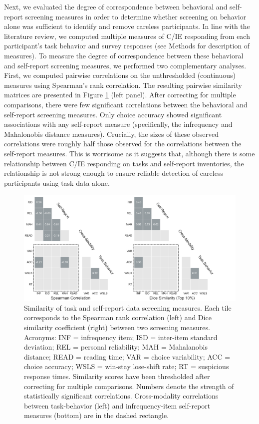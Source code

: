 \documentclass[a4paper,notitlepage,12pt]{article}
\begin{document}
Next, we evaluated the degree of correspondence between behavioral and self-report screening measures in order to determine whether screening on behavior alone was sufficient to identify and remove careless participants. In line with the literature review, we computed multiple measures of C/IE responding from each participant's task behavior and survey responses (see Methods for description of measures). To measure the degree of correspondence between these behavioral and self-report screening measures, we performed two complementary analyses. First, we computed pairwise correlations on the unthresholded (continuous) measures using Spearman's rank correlation. The resulting pairwise similarity matrices are presented in Figure \ref{fig:correspondence} (left panel). After correcting for multiple comparisons, there were few significant correlations between the behavioral and self-report screening measures. Only choice accuracy showed significant associations with any self-report measure (specifically, the infrequency and Mahalonobis distance measures). Crucially, the sizes of these observed correlations were roughly half those observed for the correlations between the self-report measures. This is worrisome as it suggests that, although there is some relationship between C/IE responding on tasks and self-report inventories, the relationship is not strong enough to ensure reliable detection of careless participants using task data alone.

\begin{figure}[!t]
\includegraphics[width=16cm, trim=0 0 3cm 0]{../figures/main_02b.png}
\centering
\captionsetup{width=0.88\textwidth}
\caption{Similarity of task and self-report data screening measures. Each tile corresponds to the Spearman rank correlation (left) and Dice similarity coefficient (right) between two screening measures. Acronyms: INF = infrequency item; ISD = inter-item standard deviation; REL = personal reliability; MAH = Mahalanobis distance; READ = reading time; VAR = choice variability; ACC = choice accuracy; WSLS = win-stay lose-shift rate; RT = suspicious response times. Similarity scores have been thresholded after correcting for multiple comparisons. Numbers denote the strength of statistically significant correlations. Cross-modality correlations between task-behavior (left) and infrequency-item self-report measures (bottom) are in the dashed rectangle.}
\label{fig:correspondence}
\end{figure}
\end{document}
